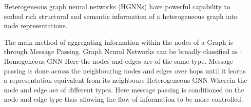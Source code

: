 \documentclass{report} %
\begin{document}



Heterogeneous graph neural networks (HGNNs) have powerful capability to embed rich structural and semantic information of a heterogeneous graph into node representations. \cite{02}


The main method of aggregating information within the nodes of a Graph is through Message Passing.
Graph Neural Networks can be broadly classified as :
Homogeneous GNN
Here the nodes and edges are of the same type. Message passing is done across the neighbouring nodes and edges over hops until it learns a representation equivalent from its neighbours
Heterogeneous GNN
Wherein the node and edge are of different types. Here message passing is conditioned on the node and edge type thus allowing the flow of information to be more controlled.
\end{document}

